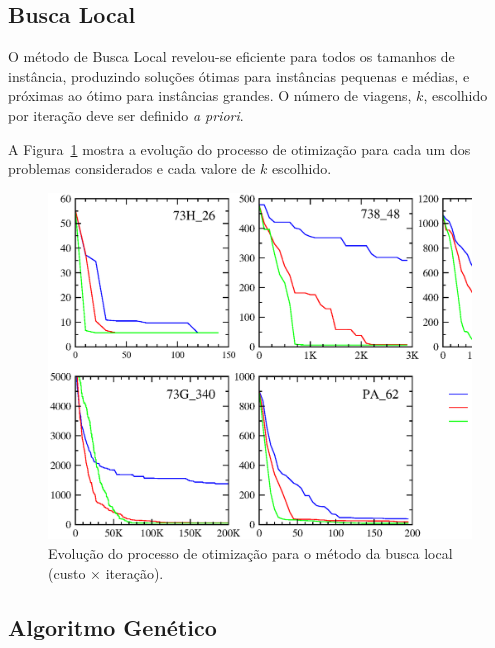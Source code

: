 
\subsection{Busca Local}
\label{sec:resultados_busca}

O método de Busca Local revelou-se eficiente para todos os tamanhos de instância, produzindo
soluções ótimas para instâncias pequenas e médias, e próximas ao ótimo para instâncias grandes. O
número de viagens, $k$, escolhido por iteração deve ser definido {\it a priori}. 

A Figura~\ref{fig:ls_results} mostra a evolução do processo de otimização para cada um dos problemas
considerados e cada valore de $k$ escolhido.

\begin{figure}[htbp]
	\begin{center}
		\includegraphics[scale=0.5]{fig/localsearch_results.eps}
		\caption{Evolução do processo de otimização para o método da busca local (custo $\times$ 
		iteração).}
		\label{fig:ls_results}
	\end{center}
\end{figure}


\subsection{Algoritmo Genético}
\label{sec:resultados_genetico}


